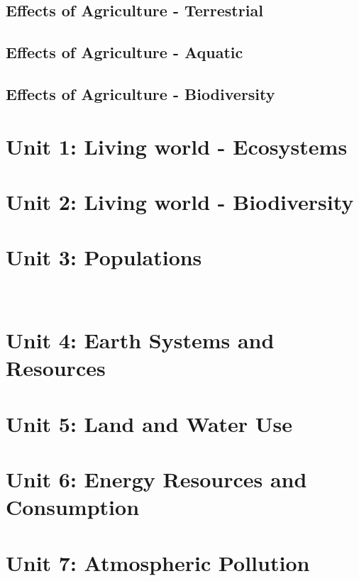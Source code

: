 \documentclass[11pt]{article}
\begin{document}
\subsection{Effects of Agriculture - Terrestrial}
\subsection{Effects of Agriculture - Aquatic}
\subsection{Effects of Agriculture - Biodiversity}

\section{Unit 1: Living world - Ecosystems}
\hypertarget{unit 2}{\section{Unit 2: Living world - Biodiversity}}
\section{Unit 3: Populations}
	\
\section{Unit 4: Earth Systems and Resources}
\section{Unit 5: Land and Water Use}
\section{Unit 6: Energy Resources and Consumption}
\section{Unit 7: Atmospheric Pollution}
\end{document}

